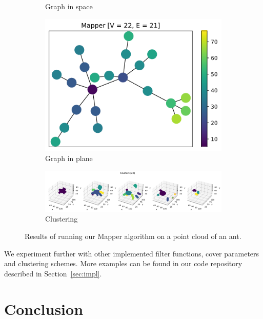 \documentclass{article}
\begin{document}
\begin{figure}[ht]
\begin{subfigure}[c]{0.3\columnwidth}
        \caption{Graph in space}
        \label{fig:ant-space}
    \end{subfigure}
    \begin{subfigure}[c]{0.3\columnwidth}
        \centering
        \includegraphics[width=\textwidth]{ant-graph-2d}
        \caption{Graph in plane}
        \label{fig:ant-plane}
    \end{subfigure}
    \begin{subfigure}[c]{0.9\columnwidth}
        \centering
        \includegraphics[width=\textwidth]{ant-clusters}
        \caption{Clustering}
        \label{fig:ant-cluster}
    \end{subfigure}
    \caption{Results of running our Mapper algorithm on a point cloud of an ant.}
    \label{fig:ant}
\end{figure}

We experiment further with other implemented filter functions, cover parameters and clustering schemes.
More examples can be found in our code repository described in Section~\ref{sec:impl}.

\section{Conclusion}\label{sec:concl}
\end{document}
